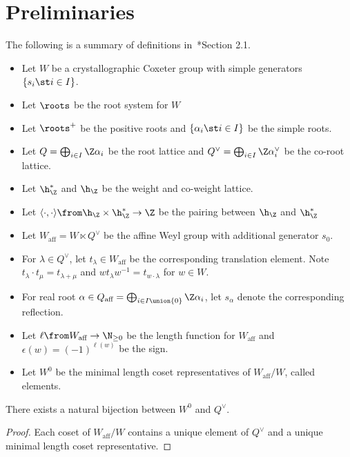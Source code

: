 \documentclass[11pt,leqno,oneside]{amsart}
\numberwithin{thm}{section}
\renewcommand{\W}{W}
\newcommand{\Waff}{\W_{\text{aff}}}
\begin{document}
\section{Preliminaries}\label{preliminaries}
\begin{defn}
  The following is a summary of definitions in~\cite{lam}*{Section 2.1}.
  \begin{itemize}
  \item Let \(\W\) be a crystallographic Coxeter group with simple
    generators \(\{s_i \st i \in I\}\).
  \item Let \(\roots\) be the root system for \(\W\)
  \item Let \(\roots^+\) be the positive roots and \(\{\alpha_i \st i
    \in I\}\) be the simple roots.
  \item Let \(Q = \bigoplus_{i \in I} \Z \alpha_i\) be the root
    lattice and \(Q^\vee = \bigoplus_{i \in I} \Z \alpha_i^\vee\) be
    the co-root lattice.
  \item Let \(\h_\Z^*\) and \(\h_\Z\) be the weight and co-weight
    lattice.
  \item Let \(\langle \cdot, \cdot \rangle \from \h_\Z \times \h_\Z^*
    \to \Z\) be the pairing between \(\h_\Z\) and \(\h_\Z^*\)
  \item Let \(\Waff = \W \ltimes Q^\vee\) be the affine Weyl group with
    additional generator \(s_0\).
  \item For \(\lambda \in Q^\vee\), let \(t_\lambda \in \Waff\) be the
    corresponding translation element. Note \(t_\lambda \cdot t_\mu =
    t_{\lambda+\mu}\) and \(w t_\lambda w^{-1} = t_{w \cdot \lambda}\)
    for \(w \in \W\).
  \item For real root \(\alpha \in Q_{\text{aff}} = \bigoplus_{i \in I
    \union \{0\}} \Z \alpha_i\), let \(s_\alpha\) denote the
  corresponding reflection.
  \item Let \(\ell \from \Waff \to \N_{\geq 0}\) be the length
    function for \(\Waff\) and \(\epsilon(w) = (-1)^{\ell(w)}\) be the
    sign. 
  \item Let \(\W^0\) be the minimal length coset representatives of
    \(\Waff/\W\), called  elements. 
  \end{itemize}
\end{defn}
\begin{prop}
  There exists a natural bijection between \(\W^0\) and \(Q^\vee\).
\end{prop}
\begin{proof}
  Each coset of \(\Waff/\W\) contains a unique element of \(Q^\vee\)
  and a unique minimal length coset representative.
\end{proof}
\end{document}
